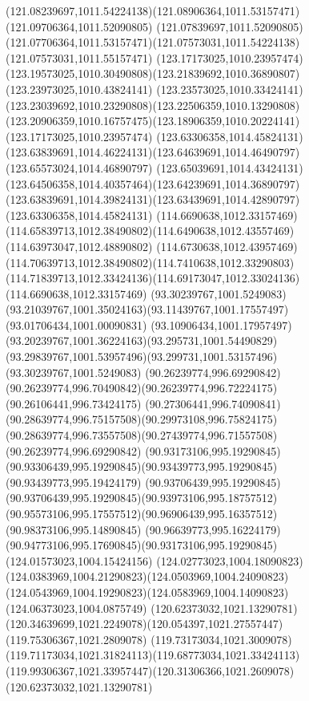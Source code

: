 {{\curveto(121.08239697,1011.54224138)(121.08906364,1011.53157471)(121.09706364,1011.52090805)
\lineto(121.07839697,1011.52090805)
\curveto(121.07706364,1011.53157471)(121.07573031,1011.54224138)(121.07573031,1011.55157471)
\moveto(123.17173025,1010.23957474)
\curveto(123.19573025,1010.30490808)(123.21839692,1010.36890807)(123.23973025,1010.43824141)
\curveto(123.23573025,1010.33424141)(123.23039692,1010.23290808)(123.22506359,1010.13290808)
\curveto(123.20906359,1010.16757475)(123.18906359,1010.20224141)(123.17173025,1010.23957474)
\moveto(123.63306358,1014.45824131)
\curveto(123.63839691,1014.46224131)(123.64639691,1014.46490797)(123.65573024,1014.46890797)
\curveto(123.65039691,1014.43424131)(123.64506358,1014.40357464)(123.64239691,1014.36890797)
\curveto(123.63839691,1014.39824131)(123.63439691,1014.42890797)(123.63306358,1014.45824131)
\moveto(114.6690638,1012.33157469)
\curveto(114.65839713,1012.38490802)(114.6490638,1012.43557469)(114.63973047,1012.48890802)
\curveto(114.6730638,1012.43957469)(114.70639713,1012.38490802)(114.7410638,1012.33290803)
\curveto(114.71839713,1012.33424136)(114.69173047,1012.33024136)(114.6690638,1012.33157469)
\moveto(93.30239767,1001.5249083)
\curveto(93.21039767,1001.35024163)(93.11439767,1001.17557497)(93.01706434,1001.00090831)
\curveto(93.10906434,1001.17957497)(93.20239767,1001.36224163)(93.295731,1001.54490829)
\curveto(93.29839767,1001.53957496)(93.299731,1001.53157496)(93.30239767,1001.5249083)
\moveto(90.26239774,996.69290842)
\curveto(90.26239774,996.70490842)(90.26239774,996.72224175)(90.26106441,996.73424175)
\curveto(90.27306441,996.74090841)(90.28639774,996.75157508)(90.29973108,996.75824175)
\curveto(90.28639774,996.73557508)(90.27439774,996.71557508)(90.26239774,996.69290842)
\moveto(90.93173106,995.19290845)
\curveto(90.93306439,995.19290845)(90.93439773,995.19290845)(90.93439773,995.19424179)
\curveto(90.93706439,995.19290845)(90.93706439,995.19290845)(90.93973106,995.18757512)
\curveto(90.95573106,995.17557512)(90.96906439,995.16357512)(90.98373106,995.14890845)
\curveto(90.96639773,995.16224179)(90.94773106,995.17690845)(90.93173106,995.19290845)
\moveto(124.01573023,1004.15424156)
\curveto(124.02773023,1004.18090823)(124.0383969,1004.21290823)(124.0503969,1004.24090823)
\curveto(124.0543969,1004.19290823)(124.0583969,1004.14090823)(124.06373023,1004.0875749)
\closepath
\moveto(120.62373032,1021.13290781)
\curveto(120.34639699,1021.2249078)(120.054397,1021.27557447)(119.75306367,1021.2809078)
\curveto(119.73173034,1021.3009078)(119.71173034,1021.31824113)(119.68773034,1021.33424113)
\curveto(119.99306367,1021.33957447)(120.31306366,1021.2609078)(120.62373032,1021.13290781)
}}

